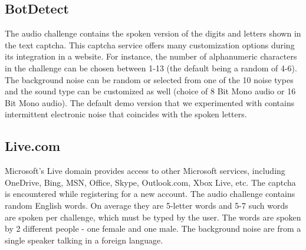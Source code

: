 \subsection{BotDetect}


The audio challenge contains the spoken version of the digits and letters shown in the text captcha.
This captcha service offers many customization options during its integration in a website. For instance, 
the number of alphanumeric characters in the challenge can be chosen between
1-13 (the default being a random of 4-6). The background noise can be random or selected from one of 
the 10 noise types and the sound type can be customized as well (choice of 8 Bit Mono audio or 16 Bit 
Mono audio). The default demo version that we experimented with contains intermittent electronic noise that 
coincides with the spoken letters.

\subsection{Live.com}

Microsoft's Live domain provides access to other Microsoft services, including
 OneDrive, Bing, MSN, Office, Skype, Outlook.com, Xbox Live, etc. The captcha is 
 encountered while registering for a new account. The audio challenge contains random English 
 words. On average they are 5-letter words and 5-7 such words are spoken per challenge, which must be typed by the user.
The words are spoken by 2 different people - one female and one male. The background noise 
are from a single speaker talking in a foreign language.

